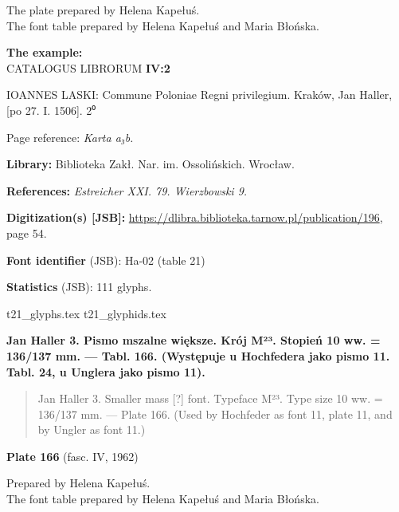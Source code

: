 \documentclass[12pt]{article}
\newcommand{\bg}{\begingl}
\newcommand{\pismoPL}[1]{{\relsize{2}\Junicode\textbf{#1}}}
\newcommand{\pismoEN}[1]{{\relsize{1}\Junicode\begin{quote}#1\end{quote}}}
\newcommand{\plate}[3]{\textbf{Plate #1} (fasc. #2, #3)}
\newcommand{\exampleBib}[1]{{\relsize{2}\Junicode\textbf{The
      example:}\\[2ex] CATALOGUS LIBRORUM \textbf{#1}}}
\newcommand{\exampleDesc}[1]{{\relsize{0}\Junicode#1}}
\newcommand{\exampleDig}[1]{{\relsize{0}\Junicode \textbf{Digitization(s) [JSB]:} #1}}
\newcommand{\exampleLib}[1]{{\relsize{0}\Junicode \textbf{Library:} #1}}
\newcommand{\examplePL}[1]{}
\newcommand{\exampleEN}[1]{}
\newcommand{\fontID}[2]{{\relsize{1}\Junicode\textbf{Font identifier} (JSB): #1 (table #2)}}
\newcommand{\fontstat}[1]{{\relsize{1}\Junicode\textbf{Statistics} (JSB): #1 glyphs.}}
\newcommand{\exampleRef}[1]{{\relsize{0}\Junicode \textbf{References:} #1}}
\newcommand{\examplePage}[1]{{Page reference: \relsize{0}\Junicode#1}}
\begin{document}
The plate prepared by Helena Kapełuś.\\
The font table prepared by Helena Kapełuś and Maria Błońska.

\bigskip

\exampleBib{IV:2}

\bigskip
\exampleDesc{IOANNES LASKI: Commune Poloniae Regni privilegium. Kraków, Jan Haller, [po 27. I. 1506]. 2⁰}

\medskip
\examplePage{\textit{Karta a₃b.}}

  \bigskip
\exampleLib{Biblioteka Zakł. Nar. im. Ossolińskich. Wrocław.}

\bigskip
\exampleRef{\textit{Estreicher XXI. 79. Wierzbowski 9.}}

\bigskip
\exampleDig{\url{https://dlibra.biblioteka.tarnow.pl/publication/196}, page 54.}

\medskip

    \examplePL{Pismo 2: wiersz 1—4, 17.}

    \medskip

    \exampleEN{Font 2: lines 1--4, 17}


\bigskip


\fontID{Ha-02}{21}

\fontstat{111}

  {t21_glyphs.tex}
  {t21_glyphids.tex}


  \newpage




  \pismoPL{Jan Haller 3. Pismo mszalne większe. Krój M²³. Stopień 10
    ww. = 136/137 mm. — Tabl. 166. (Występuje u Hochfedera jako pismo
    11. Tabl. 24, u Unglera jako pismo 11).}


  
\pismoEN{Jan Haller 3. Smaller mass [?] font. Typeface M²³. Type size 10 ww. =
    136/137 mm. — Plate 166. (Used by Hochfeder as font 11, plate
    11, and by Ungler as font 11.)}

\plate{166}{IV}{1962}

Prepared by Helena Kapełuś.\\
The font table prepared by Helena Kapełuś and Maria Błońska.
\end{document}

